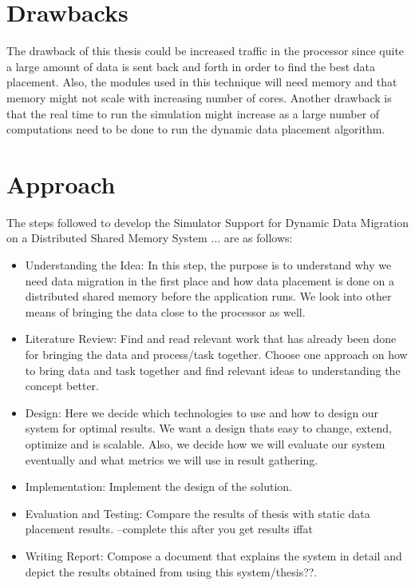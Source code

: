 \documentclass{listhesis}
\begin{document}
\section{Drawbacks}
The drawback of this thesis could be increased traffic in the processor since quite a large amount of data is sent back and forth in order to find the best data placement. Also, the modules used in this technique will need memory and that memory might not scale with increasing number of cores. Another drawback is that the real time to run the simulation might increase as a large number of computations need to be done to run the dynamic data placement algorithm.\\
\section{Approach}
The steps followed to develop the Simulator Support for Dynamic Data Migration on a Distributed Shared Memory System ... are as follows:
\begin{itemize}
  \item Understanding the Idea: In this step, the purpose is to understand why we need data migration in the first place and how data placement is done on a distributed shared memory before the application runs. We look into other means of bringing the data close to the processor as well. 
  \item Literature Review: Find and read relevant work that has already been done for bringing the data and process/task together. Choose one approach on how to bring data and task together and find relevant ideas to understanding the concept better. 
  \item Design: Here we decide which technologies to use and how to design our system for optimal results. We want a design thats easy to change, extend, optimize and is scalable. Also, we decide how we will evaluate our system eventually and what metrics we will use in result gathering. 
  \item Implementation: Implement the design of the solution. 
  \item Evaluation and Testing: Compare the results of thesis with static data placement results. --complete this after you get results iffat
  \item Writing Report: Compose a document that explains the system in detail and depict the results obtained from using this system/thesis??.
\end{itemize}
\end{document}
